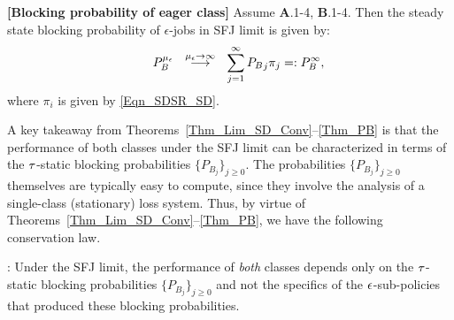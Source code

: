 \begin{thm} \textbf{[Blocking probability of eager class]} 
\label{Thm_PB}
Assume {\bf A}.1-4, {\bf B}.1-4. Then the steady state blocking
probability of $\epsilon$-jobs in SFJ limit is given by:
{\small
  \begin{align*}
    \hspace{25mm} 
    \hspace{5mm}
    P_B^{\mu_\epsilon} \ \ \stackrel{\mu_\epsilon \to
  \infty}{\longrightarrow} \ \
\sum_{j=1}^{\infty } {P_B}_j {\pi}_j =: P_B^{\infty},
    \hspace{25mm} 
  \end{align*}}
where ${\pi}_i$ is given by \eqref{Eqn_SDSR_SD}.
\end{thm}

A key takeaway from Theorems~\ref{Thm_Lim_SD_Conv}--\ref{Thm_PB} is
that the performance of both classes under the SFJ limit can be
characterized in terms of the ${\tau}$-static blocking probabilities
$\{ P_{B_j} \}_{j \geq 0}$. The probabilities
$\{ P_{B_j} \}_{j \geq 0}$ themselves are typically easy to compute,
since they involve the analysis of a single-class (stationary) loss
system. Thus, by virtue of
Theorems~\ref{Thm_Lim_SD_Conv}--\ref{Thm_PB}, we have the following
conservation law.

: Under the SFJ limit, the
performance of \emph{both} classes depends only on the ${\tau}$-static
blocking probabilities $\{ P_{B_j} \}_{j \geq 0}$ and not the
specifics of the ${ \epsilon }$-sub-policies that produced these blocking
probabilities.

